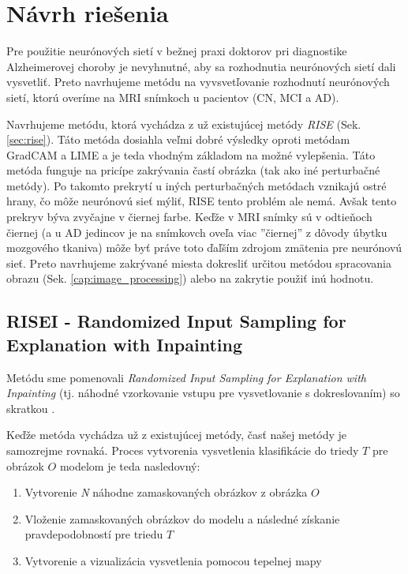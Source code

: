 \chapter{Návrh riešenia}

Pre použitie neurónových sietí v bežnej praxi doktorov pri diagnostike Alzheimerovej choroby je nevyhnutné, aby sa rozhodnutia neurónových sietí dali vysvetliť. Preto navrhujeme metódu na vyvsvetľovanie rozhodnutí neurónových sietí, ktorú overíme na MRI snímkoch u pacientov (CN, MCI a AD).

Navrhujeme metódu, ktorá vychádza z už existujúcej metódy \textit{RISE} (Sek. \ref{sec:rise}). Táto metóda dosiahla veľmi dobré výsledky oproti metódam GradCAM a LIME a je teda vhodným základom na možné vylepšenia. Táto metóda funguje na pricípe zakrývania častí obrázka (tak ako iné perturbačné metódy). Po takomto prekrytí u iných perturbačných metódach vznikajú ostré hrany, čo môže neurónovú sieť mýliť, RISE tento problém ale nemá. Avšak tento prekryv býva zvyčajne v čiernej farbe. Keďže v MRI snímky sú v odtieňoch čiernej (a u AD jedincov je na snímkovch oveľa viac ''čiernej'' z dôvody úbytku mozgového tkaniva) môže byť práve toto ďaľším zdrojom zmätenia pre neurónovú sieť. Preto navrhujeme zakrývané miesta dokresliť určitou metódou spracovania obrazu (Sek. \ref{cap:image_processing}) alebo na zakrytie použiť inú hodnotu.

\section{RISEI - Randomized Input Sampling for Explanation with Inpainting}

Metódu sme pomenovali \textit{Randomized Input Sampling for Explanation with Inpainting} (tj. náhodné vzorkovanie vstupu pre vysvetlovanie s dokreslovaním) so skratkou .

Keďže metóda vychádza už z existujúcej metódy, časť našej metódy je samozrejme rovnaká. Proces vytvorenia vysvetlenia klasifikácie do triedy $T$ pre obrázok $O$ modelom je teda nasledovný:

\begin{enumerate}
    \item Vytvorenie \textit{N} náhodne zamaskovaných obrázkov z obrázka $O$
    \item Vloženie zamaskovaných obrázkov do modelu a následné získanie pravdepodobností pre triedu $T$
    \item Vytvorenie a vizualizácia vysvetlenia pomocou tepelnej mapy
\end{enumerate}

